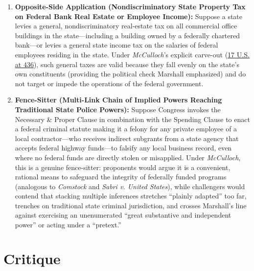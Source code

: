 \documentclass[12pt]{article}
\begin{document}
\begin{enumerate}
    \item \textbf{Opposite-Side Application (Nondiscriminatory State Property Tax on Federal Bank Real Estate or Employee Income):} Suppose a state levies a general, nondiscriminatory real-estate tax on all commercial office buildings in the state---including a building owned by a federally chartered bank---or levies a general state income tax on the salaries of federal employees residing in the state. Under \textit{McCulloch}'s explicit carve-out (\href{https://supreme.justia.com/cases/federal/us/17/316/}{17 U.S. at 436}), such general taxes are valid because they fall evenly on the state's own constituents (providing the political check Marshall emphasized) and do not target or impede the operations of the federal government.

    \item \textbf{Fence-Sitter (Multi-Link Chain of Implied Powers Reaching Traditional State Police Powers):} Suppose Congress invokes the Necessary \& Proper Clause in combination with the Spending Clause to enact a federal criminal statute making it a felony for any private employee of a local contractor---who receives indirect subgrants from a state agency that accepts federal highway funds---to falsify any local business record, even where no federal funds are directly stolen or misapplied. Under \textit{McCulloch}, this is a genuine fence-sitter: proponents would argue it is a convenient, rational means to safeguard the integrity of federally funded programs (analogous to \textit{Comstock} and \textit{Sabri v. United States}), while challengers would contend that stacking multiple inferences stretches ``plainly adapted'' too far, trenches on traditional state criminal jurisdiction, and crosses Marshall's line against exercising an unenumerated ``great substantive and independent power'' or acting under a ``pretext.''
\end{enumerate}

\section{Critique}
\end{document}
